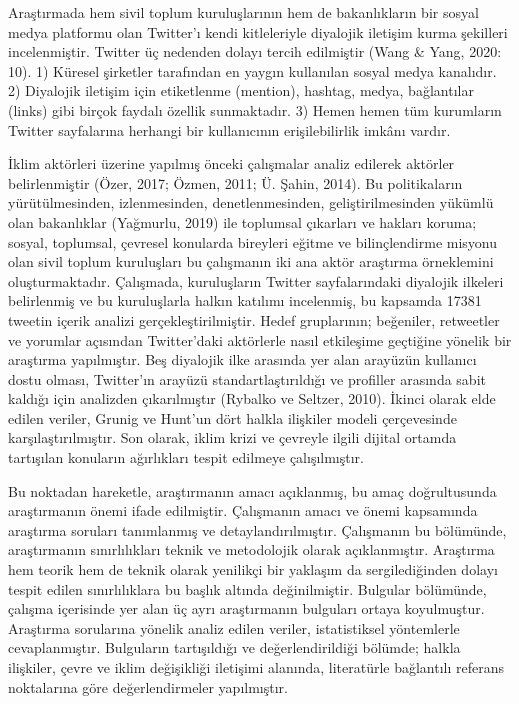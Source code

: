 \documentclass[
]{book}
\begin{document}
Araştırmada hem sivil toplum kuruluşlarının hem de bakanlıkların bir sosyal medya platformu olan Twitter'ı kendi kitleleriyle diyalojik iletişim kurma şekilleri incelenmiştir. Twitter üç nedenden dolayı tercih edilmiştir (Wang \& Yang, 2020: 10). 1) Küresel şirketler tarafından en yaygın kullanılan sosyal medya kanalıdır. 2) Diyalojik iletişim için etiketlenme (mention), hashtag, medya, bağlantılar (links) gibi birçok faydalı özellik sunmaktadır. 3) Hemen hemen tüm kurumların Twitter sayfalarına herhangi bir kullanıcının erişilebilirlik imkânı vardır.

İklim aktörleri üzerine yapılmış önceki çalışmalar analiz edilerek aktörler belirlenmiştir (Özer, 2017; Özmen, 2011; Ü. Şahin, 2014). Bu politikaların yürütülmesinden, izlenmesinden, denetlenmesinden, geliştirilmesinden yükümlü olan bakanlıklar (Yağmurlu, 2019) ile toplumsal çıkarları ve hakları koruma; sosyal, toplumsal, çevresel konularda bireyleri eğitme ve bilinçlendirme misyonu olan sivil toplum kuruluşları bu çalışmanın iki ana aktör araştırma örneklemini oluşturmaktadır.
Çalışmada, kuruluşların Twitter sayfalarındaki diyalojik ilkeleri belirlenmiş ve bu kuruluşlarla halkın katılımı incelenmiş, bu kapsamda 17381 tweetin içerik analizi gerçekleştirilmiştir. Hedef gruplarının; beğeniler, retweetler ve yorumlar açısından Twitter'daki aktörlerle nasıl etkileşime geçtiğine yönelik bir araştırma yapılmıştır. Beş diyalojik ilke arasında yer alan arayüzün kullanıcı dostu olması, Twitter'ın arayüzü standartlaştırıldığı ve profiller arasında sabit kaldığı için analizden çıkarılmıştır (Rybalko ve Seltzer, 2010). İkinci olarak elde edilen veriler, Grunig ve Hunt'un dört halkla ilişkiler modeli çerçevesinde karşılaştırılmıştır. Son olarak, iklim krizi ve çevreyle ilgili dijital ortamda tartışılan konuların ağırlıkları tespit edilmeye çalışılmıştır.

Bu noktadan hareketle, araştırmanın amacı açıklanmış, bu amaç doğrultusunda araştırmanın önemi ifade edilmiştir. Çalışmanın amacı ve önemi kapsamında araştırma soruları tanımlanmış ve detaylandırılmıştır.
Çalışmanın bu bölümünde, araştırmanın sınırlılıkları teknik ve metodolojik olarak açıklanmıştır. Araştırma hem teorik hem de teknik olarak yenilikçi bir yaklaşım da sergilediğinden dolayı tespit edilen sınırlılıklara bu başlık altında değinilmiştir.
Bulgular bölümünde, çalışma içerisinde yer alan üç ayrı araştırmanın bulguları ortaya koyulmuştur. Araştırma sorularına yönelik analiz edilen veriler, istatistiksel yöntemlerle cevaplanmıştır. Bulguların tartışıldığı ve değerlendirildiği bölümde; halkla ilişkiler, çevre ve iklim değişikliği iletişimi alanında, literatürle bağlantılı referans noktalarına göre değerlendirmeler yapılmıştır.
\end{document}
